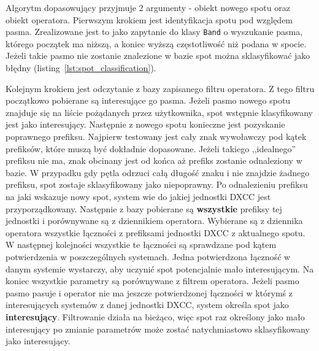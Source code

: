 \documentclass[]{mgr}
\begin{document}
        Algorytm dopasowujący przyjmuje 2 argumenty - obiekt nowego spotu oraz obiekt operatora. Pierwszym krokiem jest identyfikacja spotu pod względem pasma. Zrealizowane jest to jako zapytanie do klasy \texttt{Band} o wyszukanie pasma, którego początek ma niższą, a koniec wyższą częstotliwość niż podana w spocie. Jeżeli takie pasmo nie zostanie znalezione w bazie spot można sklasyfikować jako błędny (listing~\ref{lst:spot_classification}).
        
        Kolejnym krokiem jest odczytanie z bazy zapisanego filtru operatora. Z tego filtru początkowo pobierane są interesujące go pasma. Jeżeli pasmo nowego spotu znajduje się na liście pożądanych przez użytkownika, spot wstępnie klasyfikowany jest jako interesujący. Następnie z nowego spotu konieczne jest pozyskanie poprawnego prefiksu. Najpierw testowany jest cały znak wywoławczy pod kątek prefiksów, które muszą być dokładnie dopasowane. Jeżeli takiego ,,idealnego'' prefiksu nie ma, znak obcinany jest od końca aż prefiks zostanie odnaleziony w bazie. W przypadku gdy pętla odrzuci całą długość znaku i nie znajdzie żadnego prefiksu, spot zostaje sklasyfikowany jako niepoprawny. Po odnalezieniu prefiksu na jaki wskazuje nowy spot, system wie do jakiej jednostki DXCC jest przyporządkowany. Następnie z bazy pobierane są \textbf{wszystkie} prefiksy tej jednostki i porównywane są z dziennikiem operatora. Wybierane są z dziennika operatora wszystkie łączności z prefiksami jednostki DXCC z aktualnego spotu. W następnej kolejności wszystkie te łączności są sprawdzane pod kątem potwierdzenia w poszczególnych systemach. Jedna potwierdzona łączność w danym systemie wystarczy, aby uczynić spot potencjalnie mało interesującym. Na koniec wszystkie parametry są porównywane z filtrem operatora. Jeżeli pasmo pasmo pasuje i operator nie ma jeszcze potwierdzonej łączności w którymś z interesujących systemów z danej jednostki DXCC, system określa spot jako \textbf{interesujący}. Filtrowanie działa na bieżąco, więc spot raz określony jako mało interesujący po zmianie parametrów może zostać natychmiastowo sklasyfikowany jako interesujący.
\end{document}
